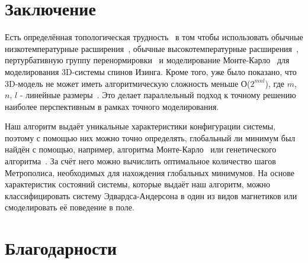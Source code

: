 \documentclass[utf8, babel, sor, jor, amsmath, amssymb, reprint]{elsarticle} %
\begin{document}
	\section*{Заключение}
	Есть определённая топологическая трудность~\cite{zhang2018topological} в том чтобы использовать обычные низкотемпературные расширения~\cite{katz2007mathematics}, обычные высокотемпературные расширения~\cite{zhang2013mathematical}, пертурбативную группу перенормировки~\cite{zhang2016mathematical} и моделирование Монте-Карло~\cite{zhang2017nature} для моделирования 3D-системы спинов Изинга. Кроме того, уже было показано, что 3D-модель не может иметь алгоритмическую сложность меньше О($2^{mnl}$), где $m$, $n$, $l$ - линейные размеры~\cite{zhang2020computational}. Это делает параллельный подход к точному решению наиболее перспективным в рамках точного моделирования.

	Наш алгоритм выдаёт уникальные характеристики конфигурации системы, поэтому с помощью них можно точно определять, глобальный ли минимум был найдён с помощью, например, алгоритма Монте-Карло~\cite{janke2008monte} или генетического алгоритма~\cite{Panchenko2007}. За счёт него можно вычислить оптимальное количество шагов Метрополиса, необходимых для нахождения глобальных минимумов. На основе характеристик состояний системы, которые выдаёт наш алгоритм, можно классифицировать систему Эдвардса-Андерсона в один из видов магнетиков или смоделировать её поведение в поле.

	
	\section*{Благодарности}
	
	
	
	
	
	
\end{document}

